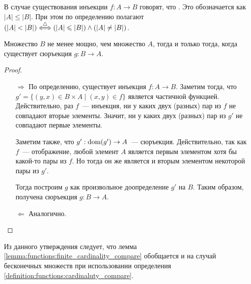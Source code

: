 \begin{definition}
    \label{definition:functions:cardinaluty_compare}
    В случае существования инъекции $ f: A \to B $ говорят, что .
    Это обозначается как $ |A| \leqslant |B| $.
    \newline
    При этом по определению полагают $ (|A| < |B|) \overset{\triangle}{\Longleftrightarrow} (|A| \leqslant |B|) \wedge (|A| \neq |B|) $.
\end{definition}


\begin{statement}
    \label{statement:functions:cardinality_compare_equivalence}
    Множество $ B $ не менее мощно, чем множество $ A $, тогда и только тогда, когда существует сюръекция $ g: B \to A $.
\end{statement}

\begin{proof}
    \begin{enumerate}
        \item[]
        \item[$\Rightarrow$]
            По определению, существует инъекция $ f: A \to B $.
            Заметим тогда, что $ g' = \{ (y, x) \in B \times A \mid (x, y) \in f \} $ является частичной функцией.
            Действительно, раз $ f $~--- инъекция, ни у каких двух (разных) пар из $ f $ не совпадают вторые элементы.
            Значит, ни у каких двух (разных) пар из $ g' $ не совпадают первые элементы.

            Заметим также, что $ g': \operatorname*{\textnormal{dom}}(g') \to A $~--- сюръекция.
            Действительно, так как $ f $~--- отображение, любой элемент $ A $ является первым элементом хотя бы какой-то пары из $ f $.
            Но тогда он же является и вторым элементом некоторой пары из $ g' $.

            Тогда построим $ g $ как произвольное доопределение $ g' $ на $ B $.
            Таким образом, получена сюръекция $ g: B \to A $.
        \item[$\Leftarrow$]
            Аналогично.
    \end{enumerate}
\end{proof}

Из данного утверждения следует, что лемма \ref{lemma:functions:finite_cardinality_compare}
обобщается и на случай бесконечных множеств при использовании определения \ref{definition:functions:cardinaluty_compare}.

